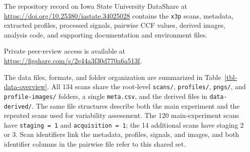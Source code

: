 \documentclass[11pt,a4paper]{article}
\begin{document}
The repository record on Iowa State University DataShare
\citep{DatasetCodeThreedimensionalDataWirecut} at
\url{https://doi.org/10.25380/iastate.34025028} contains the
\texttt{x3p} scans, metadata, extracted profiles, processed signals,
pairwise CCF values, derived images, analysis code, and supporting
documentation and environment files.

Private peer-review access is available at
\url{https://figshare.com/s/2e44a3f30d770a6a513f}.

The data files, formats, and folder organization are summarized in
Table~\ref{tbl-data-overview}. All 134 scans share the root-level
\texttt{scans/}, \texttt{profiles/}, \texttt{pngs/}, and
\texttt{profile-images/} folders, a single \texttt{meta.csv}, and the
derived files in \texttt{data-derived/}. The same file structures
describe both the main experiment and the repeated scans used for
variability assessment. The 120 main-experiment scans have
\texttt{staging = 1} and \texttt{acquisition = 1}; the 14 additional
scans have staging 2 or 3. Scan identifiers link the metadata, profiles,
signals, and images, and both identifier columns in the pairwise file
refer to this shared set.
\end{document}
